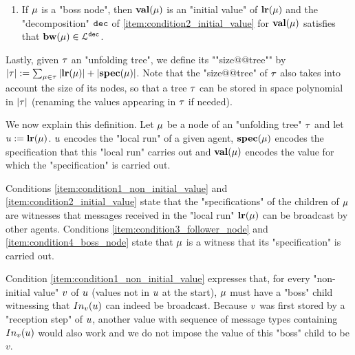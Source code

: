 \begin{definition}
\begin{enumerate}[label= (\roman*), ref=(\roman*)]
	\item \label{item:condition4_boss_node} If $\mu$ is a "boss node", then $\mathbf{val}(\mu)$ is an "initial value" of $\mathbf{lr}(\mu)$ and the "decomposition" $\mathtt{dec}$ of \ref{item:condition2_initial_value} for $\mathbf{val}(\mu)$ satisfies that $\mathbf{bw}(\mu) \in \mathcal{L}^{\mathtt{\mathtt{dec}}}$.
\end{enumerate}

\AP Lastly, given $\tau$ an "unfolding tree", we define its ""size@@tree"" by $|\tau| := \sum_{\mu \in \tau} |\mathbf{lr}(\mu)| + |\mathbf{spec}(\mu)|$. Note that the "size@@tree" of $\tau$ also takes into account the size of its nodes, so that a tree $\tau$ can be stored in space polynomial in $|\tau|$ (renaming the values appearing in $\tau$ if needed). 
\end{definition}

We now explain this definition. Let $\mu$ be a node of an "unfolding tree" $\tau$ and let $u := \mathbf{lr}(\mu)$. $u$ encodes the "local run" of a given agent, $\mathbf{spec}(\mu)$ encodes the specification that this "local run" carries out and $\mathbf{val}(\mu)$ encodes the value for which the "specification" is carried out.

Conditions \ref{item:condition1_non_initial_value} and \ref{item:condition2_initial_value} state that the "specifications" of the children of $\mu$ are witnesses that messages received in the "local run" $\mathbf{lr}(\mu)$ can be broadcast by other agents. Conditions \ref{item:condition3_follower_node} and \ref{item:condition4_boss_node} state that $\mu$ is a witness that its "specification" is carried out. 

Condition \ref{item:condition1_non_initial_value} expresses that, for every "non-initial value" $v$ of $u$ (values not in $u$ at the start), $\mu$ must have a "boss" child witnessing that $\vinput{v}{\localrun}$ can indeed be broadcast. Because $v$ was first stored by a "reception step" of $u$, another value with sequence of message types containing $\vinput{v}{\localrun}$ would also work and we do not impose the value of this "boss" child to be $v$. 

